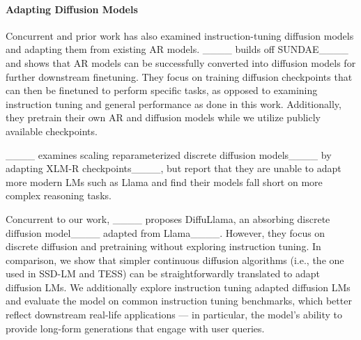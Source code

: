 \paragraph{Adapting Diffusion Models} Concurrent and prior work has also examined instruction-tuning diffusion models and adapting them from existing AR models.
____ builds off SUNDAE____ and shows that AR models can be successfully converted into diffusion models for further downstream finetuning. They focus on training diffusion checkpoints that can then be finetuned to perform specific tasks, as opposed to examining instruction tuning and general performance as done in this work. Additionally, they pretrain their own AR and diffusion models while we utilize publicly available checkpoints.

____ examines scaling reparameterized discrete diffusion models____ by adapting XLM-R checkpoints____, but report that they are unable to adapt more modern LMs such as Llama and find their models fall short on more complex reasoning tasks.

Concurrent to our work, ____ proposes DiffuLlama, an absorbing discrete diffusion model____ adapted from Llama____. However, they focus on discrete diffusion and pretraining without exploring instruction tuning. In comparison, we show that simpler continuous diffusion algorithms (i.e., the one used in SSD-LM and TESS) can be straightforwardly translated to adapt diffusion LMs. We additionally explore instruction tuning adapted diffusion LMs and evaluate the model on common instruction tuning benchmarks, which better reflect downstream real-life applications --- in particular, the model’s ability to provide long-form generations that engage with user queries. 
